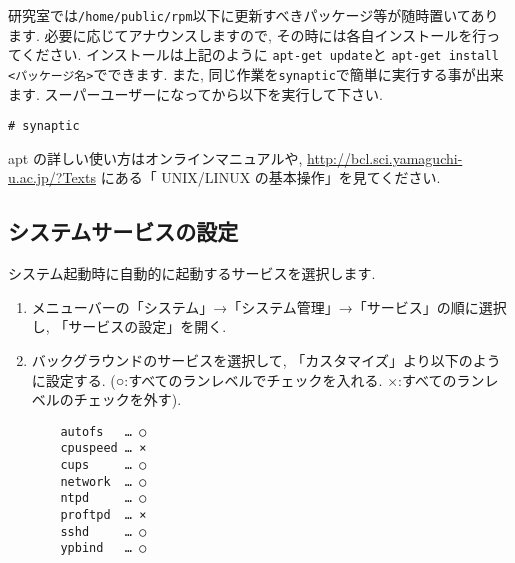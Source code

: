 \documentclass{jarticle}
\begin{document}
研究室では\verb|/home/public/rpm|以下に更新すべきパッケージ等が随時置いてあります.
必要に応じてアナウンスしますので, その時には各自インストールを行ってください.
インストールは上記のように
\verb|apt-get update|と \verb|apt-get install <パッケージ名>|でできます.
また, 同じ作業を\verb|synaptic|で簡単に実行する事が出来ます.
スーパーユーザーになってから以下を実行して下さい.
\begin{verbatim}
# synaptic
\end{verbatim}

apt の詳しい使い方はオンラインマニュアルや,
\url{http://bcl.sci.yamaguchi-u.ac.jp/?Texts}
にある「 UNIX/LINUX の基本操作」を見てください.


\subsection{システムサービスの設定}\label{tab:SS}

システム起動時に自動的に起動するサービスを選択します.
\begin{enumerate}
	\item メニューバーの「システム」→「システム管理」→「サービス」の順に選択し,
	      「サービスの設定」を開く.
	\item バックグラウンドのサービスを選択して, 「カスタマイズ」より以下のように設定する.
	      (○:すべてのランレベルでチェックを入れる. ×:すべてのランレベルのチェックを外す).

\begin{verbatim}
    autofs   … ○
    cpuspeed … ×
    cups     … ○
    network  … ○
    ntpd     … ○
    proftpd  … ×
    sshd     … ○
    ypbind   … ○
\end{verbatim}


\end{enumerate}
\end{document}
